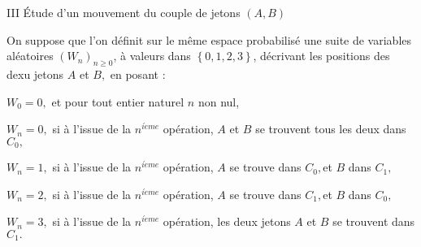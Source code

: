 \documentclass[11pt]{article}%
\begin{document}
{\Large III Étude d'un mouvement du couple de jetons }$(A,B)$


On suppose que l'on définit sur le même espace probabilisé une
suite de variables aléatoires $\left( W_{n}\right)_{n\geq 0}$, à
valeurs dans $\left\{ 0,1,2,3\right\} $, décrivant les positions des
dexu jetons $A$ et $B,$ en posant :


$W_{0} = 0,$ et pour tout entier naturel $n$ non nul,


$W_{n} = 0,$ si à l'issue de la $n^{i\grave{e}me}$ opération, $A$ et $B
$ se trouvent tous les deux dans $C_{0},$


$W_{n} = 1,$ si à l'issue de la $n^{i\grave{e}me}$ opération, $A$ se
trouve dans $C_{0},$et $B$ dans $C_{1},$


$W_{n} = 2,$ si à l'issue de la $n^{i\grave{e}me}$ opération, $A$ se
trouve dans $C_{1},$et $B$ dans $C_{0},$


$W_{n} = 3,$ si à l'issue de la $n^{i\grave{e}me}$ opération, les deux
jetons $A$ et $B$ se trouvent dans $C_{1}.$
\end{document}
